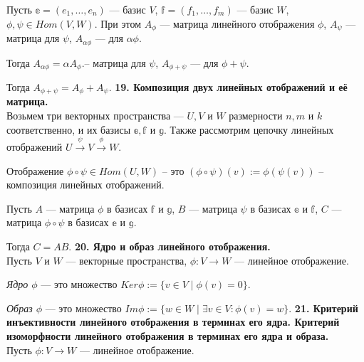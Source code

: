 \documentclass{article}
\begin{document}
Пусть $\mathbb{e} = (e_1, \ldots, e_n)$ --- базис $V$, $\mathbb{f} = (f_1, \ldots, f_m)$ --- базис $W$, $\phi, \psi \in Hom(V, W)$. При этом $A_{\phi}$ --- матрица линейного отображения $\phi$, $A_{\psi}$ --- матрица для $\psi$,  $A_{\alpha\phi}$ --- для $\alpha\phi$.

Тогда $A_{\alpha\phi} = \alpha A_{\phi}$.-- матрица для $\psi$, $A_{\phi+\psi}$ --- для $\phi + \psi$.

Тогда $A_{\phi+\psi} = A_{\phi} + A_{\psi}$.
\newline
\newline
\textbf{19. Композиция двух линейных отображений и её матрица.}\\
Возьмем три векторных пространства --- $U, V$ и $W$ размерности $n, m$ и $k$ соответственно, и их базисы $\mathbb{e}, \mathbb{f}$ и $\mathbb{g}$. Также рассмотрим цепочку линейных отображений $U \xrightarrow{\psi} V \xrightarrow{\phi} W$. 

Отображение $\phi\circ\psi \in Hom(U, W)$ -- это $(\phi\circ\psi)(v) := \phi(\psi(v))$ -- композиция линейных отображений.

Пусть $A$ --- матрица $\phi$ в базисах $\mathbb{f}$ и $\mathbb{g}$, $B$ --- матрица $\psi$ в базисах $\mathbb{e}$ и $\mathbb{f}$, $C$ --- матрица $\phi\circ\psi$ в базисах $\mathbb{e}$ и $\mathbb{g}$.

Тогда $C = AB$.
\newline
\newline
\textbf{20. Ядро и образ линейного отображения.}\\
Пусть $V$ и $W$ --- векторные пространства, $\phi: V \rightarrow W$ --- линейное отображение.

\textit{Ядро $\phi$} --- это множество $Ker\phi := \{v \in V \mid \phi(v) = 0 \}$.

\textit{Образ $\phi$} --- это множество $Im \phi := \{w \in W \mid \exists v \in V : \phi(v) = w \}$.
\newline
\newline
\textbf{21. Критерий инъективности линейного отображения в терминах его ядра. Критерий изоморфности линейного
отображения в терминах его ядра и образа.}\\
Пусть $\phi\colon V \rightarrow W$ --- линейное отображение.
\end{document}
